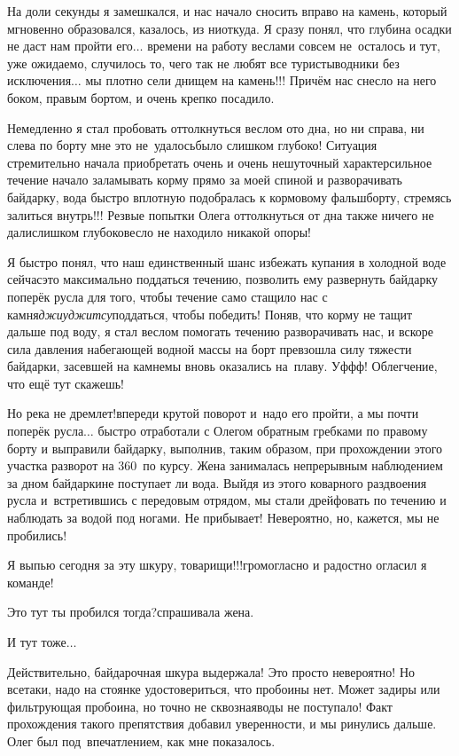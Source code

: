 На доли секунды я замешкался, и нас начало сносить вправо на камень, который мгновенно образовался, казалось, из ниоткуда. Я сразу понял, что глубина осадки не даст нам пройти его$\ldots$ времени на работу веслами совсем не~осталось и тут, уже ожидаемо, случилось то, чего так не любят все туристы\sdash водники без исключения$\ldots$ мы плотно сели днищем на камень!!! Причём нас снесло на него боком, правым бортом, и очень крепко посадило. 

Немедленно я стал пробовать оттолкнуться веслом ото дна, но ни справа, ни слева по борту мне это не~удалось\mdash было слишком глубоко! Ситуация стремительно начала приобретать очень и очень нешуточный характер\mdash сильное течение начало заламывать корму прямо за моей спиной и разворачивать байдарку, вода быстро вплотную подобралась к кормовому фальшборту, стремясь залиться внутрь!!! Резвые попытки Олега оттолкнуться от дна также ничего не дали\mdash слишком глубоко\mdash весло не находило никакой опоры! 

Я быстро понял, что наш единственный шанс избежать купания в холодной воде сейчас\mdash это максимально поддаться течению, позволить ему развернуть байдарку поперёк русла для того, чтобы течение само стащило нас с камня\mdash \textit{джиу\sdash джитсу}\mdash поддаться, чтобы победить! Поняв, что корму не тащит дальше под воду, я стал веслом помогать течению разворачивать нас, и вскоре сила давления набегающей водной массы на борт превзошла силу тяжести байдарки, засевшей на камне\mdash мы вновь оказались на~плаву. Уф\sdash ф\sdash ф! Облегчение, что ещё тут скажешь! 

Но река не дремлет!\mdash впереди крутой поворот и~надо его пройти, а мы почти поперёк русла$\ldots$ быстро отработали с Олегом обратным гребками по правому борту и выправили байдарку, выполнив, таким образом, при прохождении этого участка разворот на 360\degree~по курсу. Жена занималась непрерывным наблюдением за дном байдарки\mdash не поступает ли вода. Выйдя из этого коварного раздвоения русла и~встретившись с передовым отрядом, мы стали дрейфовать по течению и наблюдать за водой под ногами. Не прибывает! Невероятно, но, кажется, мы не пробились! 

\diagdash Я выпью сегодня за эту шкуру, товарищи!!!\mdash громогласно и радостно огласил я команде!
 
\diagdash Это тут ты пробился тогда?\mdash спрашивала жена.

\diagdash И тут тоже$\ldots$

Действительно, байдарочная шкура выдержала! Это просто невероятно! Но все\sdash таки, надо на стоянке удостовериться, что пробоины нет. Может задиры или фильтрующая пробоина, но точно не сквозная\mdash воды не поступало! Факт прохождения такого препятствия добавил уверенности, и мы ринулись дальше. Олег был под~впечатлением, как мне показалось.

